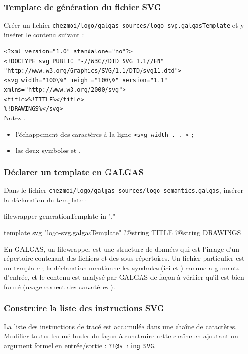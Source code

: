 \subsubsection{Template de génération du fichier SVG}
Créer un fichier \texttt{chezmoi/logo/galgas-sources/logo-svg.galgasTemplate} et y insérer le contenu suivant :

\texttt{<?xml version="1.0" standalone="no"?>}\\
\texttt{<!DOCTYPE svg PUBLIC "-//W3C//DTD SVG 1.1//EN"}\\
\texttt{\hspace*{5cm}"http://www.w3.org/Graphics/SVG/1.1/DTD/svg11.dtd">}\\
\texttt{<svg width="100\textbackslash\%" height="100\textbackslash\%" version="1.1" xmlns="http://www.w3.org/2000/svg">}\\
\texttt{<title>\%!TITLE\%</title>}\\
\texttt{\%!DRAWINGS\%</svg>}\\

Notez :
\begin{itemize}
  \item l'échappement des caractères \galgas{\%} à la ligne \texttt{<svg width ... >} ;
  \item les deux symboles  et .
\end{itemize}

\subsubsection{Déclarer un template en GALGAS}
Dans le fichier \texttt{chezmoi/logo/galgas-sources/logo-semantics.galgas}, insérer la déclaration du template :
\begin{galgascode}
filewrapper generationTemplate in "." {
} {
} {

template svg "logo-svg.galgasTemplate"
  ?@string TITLE
  ?@string DRAWINGS
}
\end{galgascode}

En GALGAS, un filewrapper est une structure de données qui est l'image d'un répertoire contenant des fichiers et des sous répertoires. Un fichier particulier est un template ; la déclaration mentionne les symboles (ici  et ) comme arguments d'entrée, et le contenu est analysé par GALGAS de façon à vérifier qu'il est bien formé (usage correct des caractères \galgas{\%}).

\subsubsection{Construire la liste des instructions SVG}
La liste des instructions de tracé est accumulée dans une chaîne de caractères. Modifier toutes les méthodes  de façon à construire cette chaîne en ajoutant un argument formel en entrée/sortie : \texttt{?!@string SVG}.


